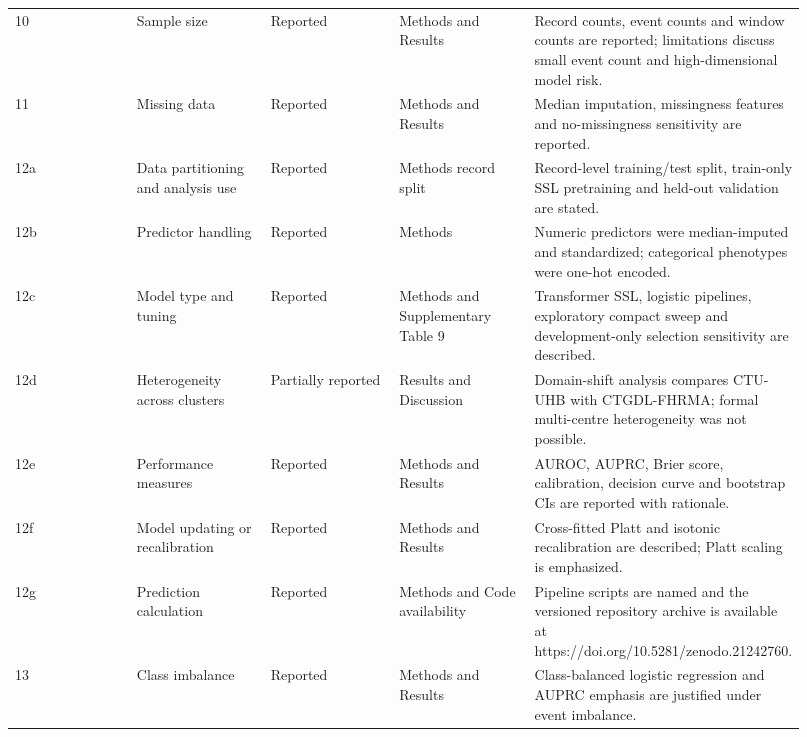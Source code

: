 \documentclass[utf8]{frontiers_suppmat}
\begin{document}
\begin{landscape}
\begin{longtable}{L{0.184\linewidth} L{0.184\linewidth} L{0.184\linewidth} L{0.184\linewidth} L{0.184\linewidth}}
10 & Sample size & Reported & Methods and Results & Record counts, event counts and window counts are reported;\allowbreak{} limitations discuss small event count and high-\allowbreak{}dimensional model risk.\allowbreak{} \\
11 & Missing data & Reported & Methods and Results & Median imputation, missingness features and no-\allowbreak{}missingness sensitivity are reported.\allowbreak{} \\
12a & Data partitioning and analysis use & Reported & Methods record split & Record-\allowbreak{}level training/\allowbreak{}test split, train-\allowbreak{}only SSL pretraining and held-\allowbreak{}out validation are stated.\allowbreak{} \\
12b & Predictor handling & Reported & Methods & Numeric predictors were median-\allowbreak{}imputed and standardized;\allowbreak{} categorical phenotypes were one-\allowbreak{}hot encoded.\allowbreak{} \\
12c & Model type and tuning & Reported & Methods and Supplementary Table 9 & Transformer SSL, logistic pipelines, exploratory compact sweep and development-\allowbreak{}only selection sensitivity are described.\allowbreak{} \\
12d & Heterogeneity across clusters & Partially reported & Results and Discussion & Domain-\allowbreak{}shift analysis compares CTU-\allowbreak{}UHB with CTGDL-\allowbreak{}FHRMA;\allowbreak{} formal multi-\allowbreak{}centre heterogeneity was not possible.\allowbreak{} \\
12e & Performance measures & Reported & Methods and Results & AUROC, AUPRC, Brier score, calibration, decision curve and bootstrap CIs are reported with rationale.\allowbreak{} \\
12f & Model updating or recalibration & Reported & Methods and Results & Cross-\allowbreak{}fitted Platt and isotonic recalibration are described;\allowbreak{} Platt scaling is emphasized.\allowbreak{} \\
12g & Prediction calculation & Reported & Methods and Code availability & Pipeline scripts are named and the versioned repository archive is available at https:\allowbreak{}/\allowbreak{}/\allowbreak{}doi.\allowbreak{}org/\allowbreak{}10.\allowbreak{}5281/\allowbreak{}zenodo.\allowbreak{}21242760.\allowbreak{} \\
13 & Class imbalance & Reported & Methods and Results & Class-\allowbreak{}balanced logistic regression and AUPRC emphasis are justified under event imbalance.\allowbreak{} \\

\end{longtable}
\end{landscape}
\end{document}
